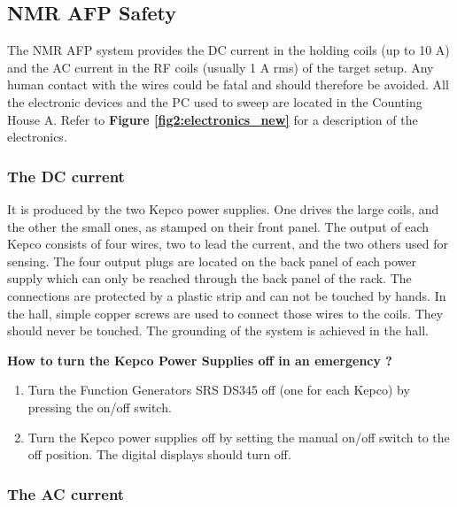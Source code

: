 \begin{safetyen}{10}{5}
\subsection{NMR AFP Safety }

The NMR AFP system provides the DC current in the holding coils (up to
10 A) and the AC current in the RF 
coils (usually 1 A rms) of the target setup. Any human contact with the
wires could be fatal and should 
therefore be avoided. All the electronic devices and the PC used
to sweep are located in the Counting House A.
Refer to {\bf Figure \ref{fig2:electronics_new}} for a description of the
electronics.

\subsubsection{ The DC current}

It is produced by the two Kepco power supplies. 
One drives the large coils, and the other the small ones, as stamped 
on their front panel. The output of each Kepco consists of four wires,
two to lead the current, 
and the two others used for sensing. The four output plugs are located
on the back panel of each power 
supply which can only be reached through the back
panel of the rack. The connections are protected by a plastic strip and
can not be touched by hands. 
In the hall, simple copper screws are used to connect those wires to the
coils. They should never be 
touched. The grounding of the system is achieved in the hall.  

\centerline {\bf How to turn the Kepco Power Supplies off in an
emergency ?}

\begin{enumerate}

\item Turn the Function Generators SRS DS345 off (one for each Kepco) by
pressing the on/off switch.

\item Turn the Kepco power supplies off by setting the manual on/off
switch to the off position. The digital 
displays should turn off. 

\end{enumerate} 

\subsubsection{ The AC current}


\end{safetyen}
